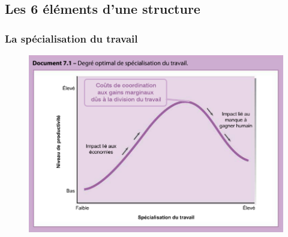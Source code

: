 \documentclass[letterpaper, 12pt]{article}
\begin{document}
	\subsection{Les 6 \'el\'ements d'une structure}
		\subsubsection{La sp\'ecialisation du travail}
			\begin{figure}[H]
				\centering
				\includegraphics[scale=0.66]{Images/specialisation}			
			\end{figure}
\end{document}
